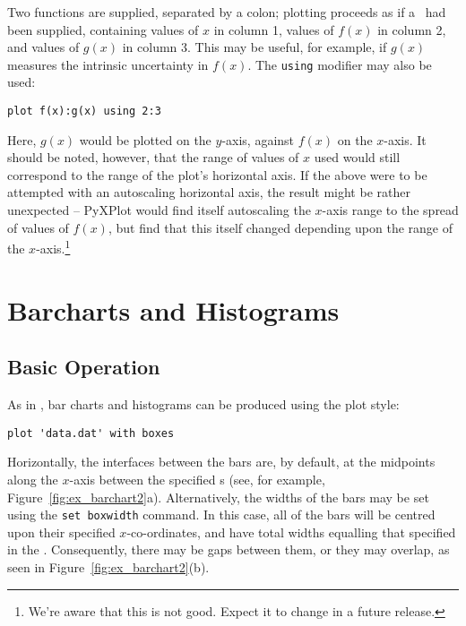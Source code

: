 \noindent Two functions are supplied, separated by a colon; plotting proceeds
as if a \datafile\ had been supplied, containing values of $x$ in column 1,
values of $f(x)$ in column 2, and values of $g(x)$ in column 3. This may be
useful, for example, if $g(x)$ measures the intrinsic uncertainty in $f(x)$.
The {\tt using} modifier may also be used:

\begin{verbatim}
plot f(x):g(x) using 2:3
\end{verbatim}

Here, $g(x)$ would be plotted on the $y$-axis, against $f(x)$ on the $x$-axis.
It should be noted, however, that the range of values of $x$ used would still
correspond to the range of the plot's horizontal axis. If the above were to be
attempted with an autoscaling horizontal axis, the result might be rather
unexpected -- PyXPlot would find itself autoscaling the $x$-axis range to the
spread of values of $f(x)$, but find that this itself changed depending upon
the range of the $x$-axis.\footnote{We're aware that this is not good. Expect
it to change in a future release.}

\section{Barcharts and Histograms}
\label{barcharts}

\subsection{Basic Operation}

As in \gnuplot, bar charts and histograms can be produced using the
 plot style:

\begin{verbatim} 
plot 'data.dat' with boxes
\end{verbatim}

\noindent Horizontally, the interfaces between the bars are, by default, at the
midpoints along the $x$-axis between the specified \datapoint s (see, for
example, Figure~\ref{fig:ex_barchart2}a).  Alternatively, the widths of the
bars may be set using the {\tt set boxwidth} command. In this case, all of
the bars will be centred upon their specified $x$-co-ordinates, and have total
widths equalling that specified in the . Consequently, there may be
gaps between them, or they may overlap, as seen in
Figure~\ref{fig:ex_barchart2}(b).

